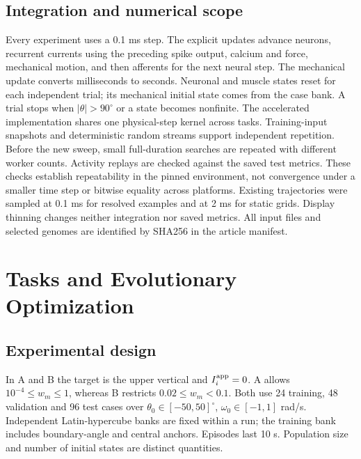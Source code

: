 \documentclass{styles/svproc}
\begin{document}
\subsection{Integration and numerical scope}
Every experiment uses a 0.1 ms step. The explicit updates advance neurons, recurrent currents using the preceding spike output, calcium and force, mechanical motion, and then afferents for the next neural step. The mechanical update converts milliseconds to seconds. Neuronal and muscle states reset for each independent trial; its mechanical initial state comes from the case bank. A trial stops when $|\theta|>90^\circ$ or a state becomes nonfinite. The accelerated implementation shares one physical-step kernel across tasks. Training-input snapshots and deterministic random streams support independent repetition. Before the new sweep, small full-duration searches are repeated with different worker counts. Activity replays are checked against the saved test metrics. These checks establish repeatability in the pinned environment, not convergence under a smaller time step or bitwise equality across platforms. Existing trajectories were sampled at 0.1 ms for resolved examples and at 2 ms for static grids. Display thinning changes neither integration nor saved metrics. All input files and selected genomes are identified by SHA256 in the article manifest.

\section{Tasks and Evolutionary Optimization}
\subsection{Experimental design}
\label{sec:design}
In A and B the target is the upper vertical and $I_i^{\rm app}=0$. A allows $10^{-4}\le w_m\le1$, whereas B restricts $0.02\le w_m<0.1$. Both use 24 training, 48 validation and 96 test cases over $\theta_0\in[-50,50]^\circ$, $\omega_0\in[-1,1]$ rad/s. Independent Latin-hypercube banks are fixed within a run; the training bank includes boundary-angle and central anchors. Episodes last 10 s. Population size and number of initial states are distinct quantities.
\end{document}
